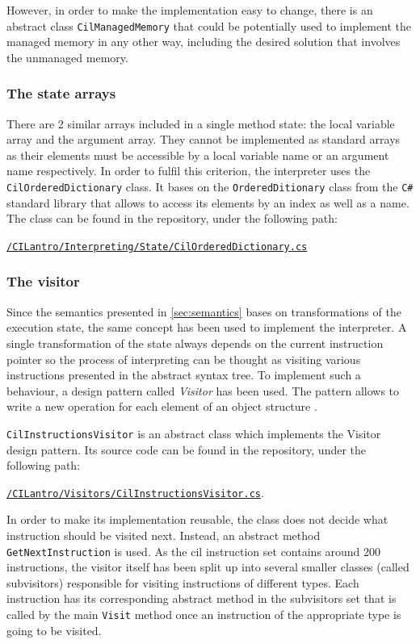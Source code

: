 \documentclass{article}
\numberwithin{equation}{section}
\begin{document}
However, in order to make the implementation easy to change, there is an abstract class \texttt{CilManagedMemory} that could be potentially used to implement the managed memory in any other way, including the desired solution that involves the unmanaged memory.

\subsubsection{The state arrays}

There are 2 similar arrays included in a single method state: the local variable array and the argument array. They cannot be implemented as standard arrays as their elements must be accessible by a local variable name or an argument name respectively. In order to fulfil this criterion, the interpreter uses the \texttt{CilOrderedDictionary} class. It bases on the \texttt{OrderedDitionary} class from the \texttt{C\#} standard library that allows to access its elements by an index as well as a name. The class can be found in the repository, under the following path:
\begin{center}
	\href{https://github.com/kvasnyk/CILantro/blob/master/CILantro/CILantro/Interpreting/State/CilOrderedDictionary.cs}{\texttt{/CILantro/Interpreting/State/CilOrderedDictionary.cs}}
\end{center}

\subsubsection{The visitor}
\label{sec:visitor}

Since the semantics presented in \ref{sec:semantics} bases on transformations of the execution state, the same concept has been used to implement the interpreter. A single transformation of the state always depends on the current instruction pointer so the process of interpreting can be thought as visiting various instructions presented in the abstract syntax tree. To implement such a behaviour, a design pattern called \textit{Visitor} has been used. The pattern allows to write a new operation for each element of an object structure \cite{designPatterns}.

\texttt{CilInstructionsVisitor} is an abstract class which implements the Visitor design pattern. Its source code can be found in the repository, under the following path:
\begin{center}
\href{https://github.com/kvasnyk/CILantro/blob/master/CILantro/CILantro/Visitors/CilInstructionsVisitor.cs}{\texttt{/CILantro/Visitors/CilInstructionsVisitor.cs}}.
\end{center}
In order to make its implementation reusable, the class does not decide what instruction should be visited next. Instead, an abstract method \texttt{GetNextInstruction} is used. As the \acrshort{cil} instruction set contains around 200 instructions, the visitor itself has been split up into several smaller classes (called subvisitors) responsible for visiting instructions of different types. Each instruction has its corresponding abstract method in the subvisitors set that is called by the main \texttt{Visit} method once an instruction of the appropriate type is going to be visited.
\end{document}
